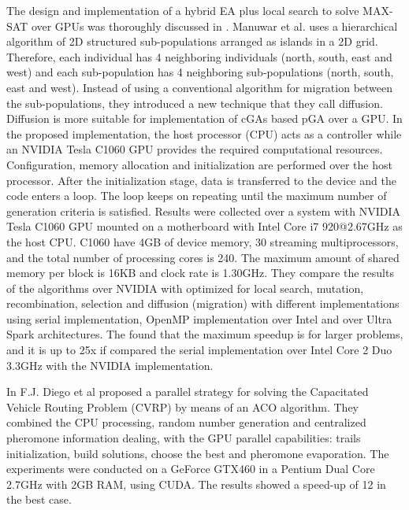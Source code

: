 \documentclass[prodmode,acmtecs]{acmsmall}
\begin{document}
The design and implementation of a hybrid EA plus local search to solve MAX-SAT over GPUs was thoroughly discussed in \cite{Munawar:2009:HGA:1666141_1666143}. Manuwar et al. uses a hierarchical algorithm of 2D structured sub-populations arranged as islands in a 2D grid. Therefore, each individual has 4 neighboring individuals (north, south, east and west) and each sub-population has 4 neighboring sub-populations (north, south, east and west). Instead of using a conventional algorithm for migration between the sub-populations, they introduced a new technique that they call diffusion. Diffusion is more suitable for implementation of cGAs based pGA over a GPU. In the proposed implementation, the host processor (CPU) acts as a controller while an NVIDIA Tesla C1060 GPU provides the required computational resources. Configuration, memory allocation and initialization are performed over the host processor. After the initialization stage, data is transferred to the device and the code enters a loop. The loop keeps on repeating until the maximum number of generation criteria is satisfied. Results were collected over a system with NVIDIA Tesla C1060 GPU mounted on a motherboard with Intel Core i7 920@2.67GHz as the host CPU. C1060 have 4GB of device memory, 30 streaming multiprocessors, and the total number of processing cores is 240. The maximum amount of shared memory per block is 16KB and clock rate is 1.30GHz. They compare the results of the algorithms over NVIDIA with optimized for local search, mutation, recombination, selection and diffusion (migration) with different implementations using serial implementation, OpenMP implementation over Intel and over Ultra Spark architectures. The found that the maximum speedup is for larger problems, and it is up to 25x if compared the serial implementation over Intel Core 2 Duo 3.3GHz with the NVIDIA implementation. 

In \cite{fjdiego-vrp} F.J. Diego et al proposed a parallel strategy for solving the Capacitated Vehicle Routing Problem (CVRP) by means of an ACO algorithm. They combined the CPU processing, random number generation and centralized pheromone information dealing, with the GPU parallel capabilities: trails initialization, build solutions, choose the best and pheromone evaporation. The experiments were conducted on a GeForce GTX460 in a Pentium Dual Core 2.7GHz with 2GB RAM, using CUDA. The results showed a speed-up of 12 in the best case.
\end{document}
